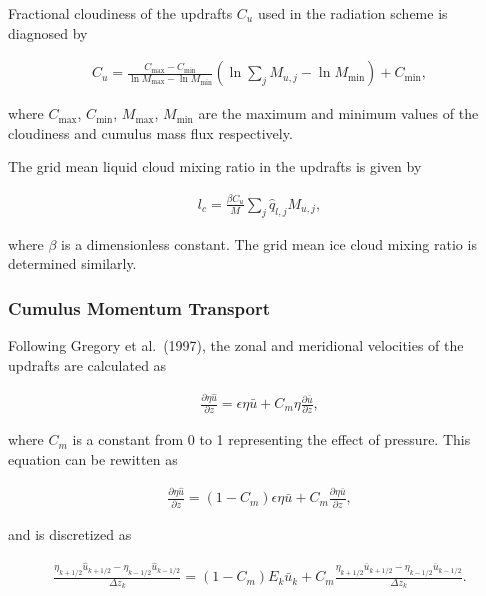Fractional cloudiness of the updrafts \(C_u\) used in the radiation scheme is diagnosed by

\begin{eqnarray}
 C_u = \frac{C_\mathrm{max} - C_\mathrm{min}}{\ln M_\mathrm{max} - \ln M_\mathrm{min}}(\ln \sum_j M_{u,j} - \ln M_\mathrm{min}) + C_\mathrm{min},
\end{eqnarray}

where \(C_\mathrm{max}\), \(C_\mathrm{min}\), \(M_\mathrm{max}\), \(M_\mathrm{min}\) are the maximum and minimum values of the cloudiness and cumulus mass flux respectively.

The grid mean liquid cloud mixing ratio in the updrafts is given by

\begin{eqnarray}
 l_c = \frac{\beta C_u}{M} \sum_j \hat{q}_{l,j} M_{u,j},
\end{eqnarray}

where \(\beta\) is a dimensionless constant. The grid mean ice cloud mixing ratio is determined similarly.

\hypertarget{cumulus-momentum-transport}{%
\subsubsection{Cumulus Momentum Transport}\label{cumulus-momentum-transport}}

Following Gregory et al.~(1997), the zonal and meridional velocities of the updrafts are calculated as

\begin{eqnarray}
 \frac{\partial \eta \hat{u}}{\partial z} = \epsilon \eta \bar{u} + C_m \eta \frac{\partial \bar{u}}{\partial z},
\end{eqnarray}

where \(C_m\) is a constant from 0 to 1 representing the effect of pressure. This equation can be rewitten as

\begin{eqnarray}
 \frac{\partial \eta \hat{u}}{\partial z} = (1-C_m) \epsilon \eta \bar{u} + C_m \frac{\partial \eta \bar{u}}{\partial z},
\end{eqnarray}

and is discretized as

\begin{eqnarray}
  \frac{\eta_{k+1/2} \hat{u}_{k+1/2} - \eta_{k-1/2} \hat{u}_{k-1/2}}{\Delta z_k} = (1-C_m) E_k \bar{u}_k
          + C_m \frac{\eta_{k+1/2} \bar{u}_{k+1/2} - \eta_{k-1/2} \bar{u}_{k-1/2}}{\Delta z_k}.
\end{eqnarray}

